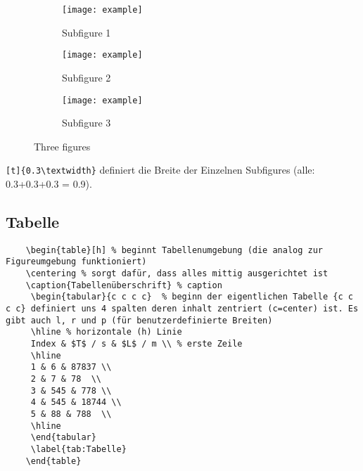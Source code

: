 \documentclass[twoside, 11pt, ngerman, a4paper, biblography=totoc]{article}
\begin{document}
\begin{figure}[h!]
     \centering
     \begin{subfigure}[b]{0.3\textwidth}
         \centering
         \texttt{[image: example]}
         \caption{Subfigure 1}
         \label{fig:subfig1}
     \end{subfigure}
     \hfill
     \begin{subfigure}[b]{0.3\textwidth}
         \centering
         \texttt{[image: example]}
         \caption{Subfigure 2}
         \label{fig:subfig2}
     \end{subfigure}
     \hfill
     \begin{subfigure}[b]{0.3\textwidth}
         \centering
         \texttt{[image: example]}
         \caption{Subfigure 3}
         \label{fig:subfig3}
     \end{subfigure}
        \caption{Three figures}
        \label{fig:three graphs}
\end{figure}

\texttt{[t]\{0.3\textbackslash textwidth\}} definiert die Breite der Einzelnen Subfigures (alle: 0.3+0.3+0.3 = 0.9).

\subsection{Tabelle}
\begin{lstlisting}
	\begin{table}[h] % beginnt Tabellenumgebung (die analog zur Figureumgebung funktioniert)
	\centering % sorgt dafür, dass alles mittig ausgerichtet ist
	\caption{Tabellenüberschrift} % caption
	 \begin{tabular}{c c c c}  % beginn der eigentlichen Tabelle {c c c c} definiert uns 4 spalten deren inhalt zentriert (c=center) ist. Es gibt auch l, r und p (für benutzerdefinierte Breiten)
	 \hline % horizontale (h) Linie
	 Index & $T$ / s & $L$ / m \\ % erste Zeile
	 \hline
	 1 & 6 & 87837 \\ 
	 2 & 7 & 78  \\
	 3 & 545 & 778 \\
	 4 & 545 & 18744 \\
	 5 & 88 & 788  \\
	 \hline
	 \end{tabular}
	 \label{tab:Tabelle}
	\end{table}
\end{lstlisting}
\end{document}
